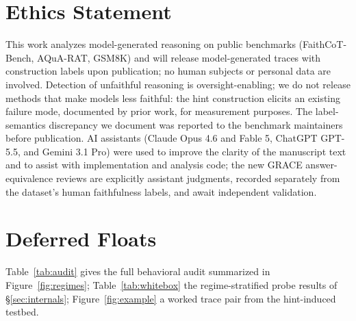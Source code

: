 \documentclass[11pt]{article}
\begin{document}
\section*{Ethics Statement}
This work analyzes model-generated reasoning on public benchmarks (FaithCoT-Bench, AQuA-RAT, GSM8K) and will release model-generated traces with construction labels upon publication; no human subjects or personal data are involved. Detection of unfaithful reasoning is oversight-enabling; we do not release methods that make models less faithful: the hint construction elicits an existing failure mode, documented by prior work, for measurement purposes. The label-semantics discrepancy we document was reported to the benchmark maintainers before publication. AI assistants (Claude Opus 4.6 and Fable 5, ChatGPT GPT-5.5, and Gemini 3.1 Pro) were used to improve the clarity of the manuscript text and to assist with implementation and analysis code; the new GRACE answer-equivalence reviews are explicitly assistant judgments, recorded separately from the dataset's human faithfulness labels, and await independent validation.




\appendix

\section{Deferred Floats}
\label{app:floats}
Table~\ref{tab:audit} gives the full behavioral audit summarized in Figure~\ref{fig:regimes}; Table~\ref{tab:whitebox} the regime-stratified probe results of \S\ref{sec:internals}; Figure~\ref{fig:example} a worked trace pair from the hint-induced testbed.
\end{document}
